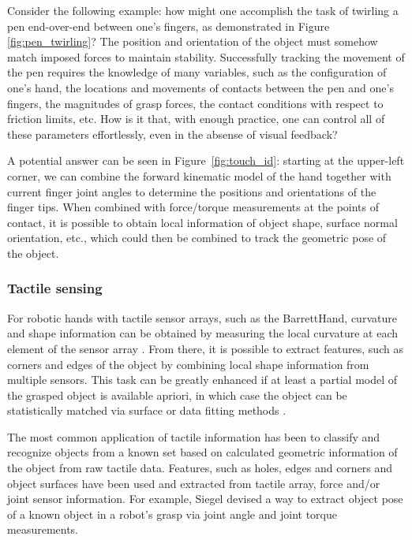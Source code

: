 Consider the following example: how might one accomplish the task of twirling a pen end-over-end between one's fingers, as demonstrated in Figure \ref{fig:pen_twirling}? 
The position and orientation of the object must somehow match imposed forces to maintain stability.
Successfully tracking the movement of the pen requires the knowledge of many variables, such as the configuration of one's hand, the locations and movements of contacts between the pen and one's fingers, the magnitudes of grasp forces, the contact conditions with respect to friction limits, etc.
How is it that, with enough practice, one can control all of these parameters effortlessly, even in the absense of visual feedback? 

A potential answer can be seen in Figure~\ref{fig:touch_id}: starting at the upper-left corner, we can combine the forward kinematic model of the hand together with current finger joint angles to determine the positions and orientations of the finger tips.
When combined with force/torque measurements at the points of contact, it is possible to obtain local information of object shape, surface normal orientation, etc., which could then be combined to track the geometric pose of the object.

\subsubsection*{Tactile sensing}

For robotic hands with tactile sensor arrays, such as the BarrettHand, curvature and shape information can be obtained by measuring the local curvature at each element of the sensor array \cite{cutkosky2008force}.
From there, it is possible to extract features, such as corners and edges of the object by combining local shape information from multiple sensors.
This task can be greatly enhanced if at least a partial model of the grasped object is available apriori, in which case the object can be statistically matched via surface or data fitting methods \cite{fearing1990tactile}.

The most common application of tactile information has been to classify and recognize objects from a known set based on calculated geometric information of the object from raw tactile data.
Features, such as holes, edges and corners \cite{cutkosky2008force} and object surfaces \cite{overton1981tactile} have been used and extracted from tactile array, force and/or joint sensor information.
For example, Siegel \cite{siegel1991finding} devised a way to extract object pose of a known object in a robot's grasp via joint angle and joint torque measurements.

